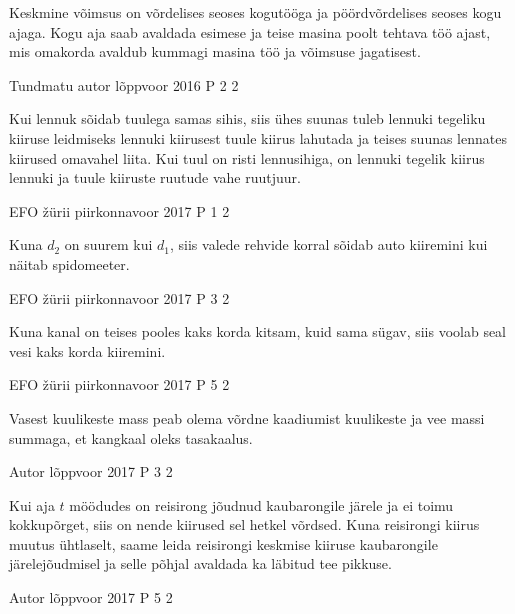 \documentclass[11pt]{article}
\begin{document}
{{\ifHint
Keskmine võimsus on võrdelises seoses kogutööga ja pöördvõrdelises seoses kogu ajaga. Kogu aja saab avaldada esimese ja teise masina poolt tehtava töö ajast, mis omakorda avaldub kummagi masina töö ja võimsuse jagatisest.
\fi
}

{Tundmatu autor} %
{lõppvoor} %
{2016} %
{P 2} %
{2} %
{

\ifHint
Kui lennuk sõidab tuulega samas sihis, siis ühes suunas tuleb lennuki tegeliku kiiruse leidmiseks lennuki kiirusest tuule kiirus lahutada ja teises suunas lennates kiirused omavahel liita. Kui tuul on risti lennusihiga, on lennuki tegelik kiirus lennuki ja tuule kiiruste ruutude vahe ruutjuur.
\fi
}

{EFO žürii} %
{piirkonnavoor} %
{2017} %
{P 1} %
{2} %
{

\ifHint
Kuna $d_2$ on suurem kui $d_1$, siis valede rehvide korral sõidab auto kiiremini kui näitab spidomeeter.
\fi
}

{EFO žürii} %
{piirkonnavoor} %
{2017} %
{P 3} %
{2} %
{

\ifHint
Kuna kanal on teises pooles kaks korda kitsam, kuid sama sügav, siis voolab seal vesi kaks korda kiiremini.
\fi
}

{EFO žürii} %
{piirkonnavoor} %
{2017} %
{P 5} %
{2} %
{

\ifHint
Vasest kuulikeste mass peab olema võrdne kaadiumist kuulikeste ja vee massi summaga, et kangkaal oleks tasakaalus.
\fi
}

{Autor} %
{lõppvoor} %
{2017} %
{P 3} %
{2} %
{

\ifHint
Kui aja $t$ möödudes on reisirong jõudnud kaubarongile järele ja ei toimu kokkupõrget, siis on nende kiirused sel hetkel võrdsed. Kuna reisirongi kiirus muutus ühtlaselt, saame leida reisirongi keskmise kiiruse kaubarongile järelejõudmisel ja selle põhjal avaldada ka läbitud tee pikkuse.
\fi
}

{Autor} %
{lõppvoor} %
{2017} %
{P 5} %
{2} %
{

}}
\end{document}
